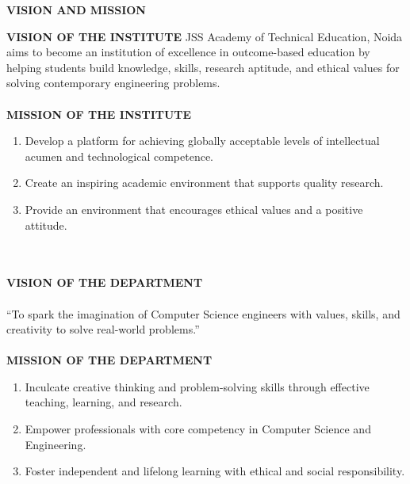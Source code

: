 \newcommand{\normal}{\fontsize{12pt}{16pt}\selectfont}
\newcommand{\size}{\fontsize{14pt}{18pt}\selectfont}
\newcommand{\bigsize}{\fontsize{16pt}{20pt}\selectfont}
\newcommand{\bigbigsize}{\fontsize{20pt}{24pt}\selectfont}
\begin{center}
{\size\textbf{VISION AND MISSION}}
\end{center}
\vspace{5mm}
\textbf{VISION OF THE INSTITUTE}
JSS Academy of Technical Education, Noida aims to become an institution of excellence in outcome-based education by helping students build knowledge, skills, research aptitude, and ethical values for solving contemporary engineering problems.
\\
\\
\textbf{MISSION OF THE INSTITUTE}
\begin{enumerate}
    \item Develop a platform for achieving globally acceptable levels of intellectual acumen and technological competence.
    \item Create an inspiring academic environment that supports quality research.
    \item Provide an environment that encourages ethical values and a positive attitude.
\end{enumerate}
\\
\\
\textbf{VISION OF THE DEPARTMENT}
\\
\\
``To spark the imagination of Computer Science engineers with values, skills, and creativity to solve real-world problems.''
\\
\\
\textbf{MISSION OF THE DEPARTMENT}
\begin{enumerate}
    \item Inculcate creative thinking and problem-solving skills through effective teaching, learning, and research.
    \item Empower professionals with core competency in Computer Science and Engineering.
    \item Foster independent and lifelong learning with ethical and social responsibility.
\end{enumerate}

